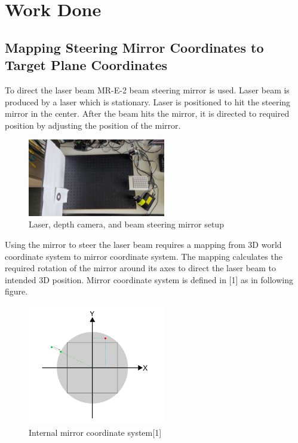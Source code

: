 \chapter{Work Done}
\label{ch:work_done}

\section{Mapping Steering Mirror Coordinates to Target Plane Coordinates}
\label{sec:Mapping Steering Mirror Coordinates to Target Plane Coordinates}

To direct the laser beam MR-E-2 beam steering mirror is used.
Laser beam is produced by a laser which is stationary. Laser
is positioned to hit the steering mirror in the center. After
the beam hits the mirror, it is directed to required position
by adjusting the position of the mirror.


\begin{figure}[!htb]\centering
    \includegraphics*[width = 6cm]{bilder/project/setup.jpg}
    \caption{Laser, depth camera, and beam steering mirror setup}
    \label{fig:setup}
\end{figure}

Using the mirror to steer the laser beam requires a mapping from
3D world coordinate system to mirror coordinate system. The
mapping calculates the required rotation of the mirror around
its axes to direct the laser beam to intended 3D position.
Mirror coordinate system is defined in [1] as in following figure.




\begin{figure}[!htb]\centering
    \includegraphics*[width = 6cm]{bilder/project/mirror_coordinates.png}
    \caption{Internal mirror coordinate system[1]}
    \label{fig:mirror_coordinates}
\end{figure}


